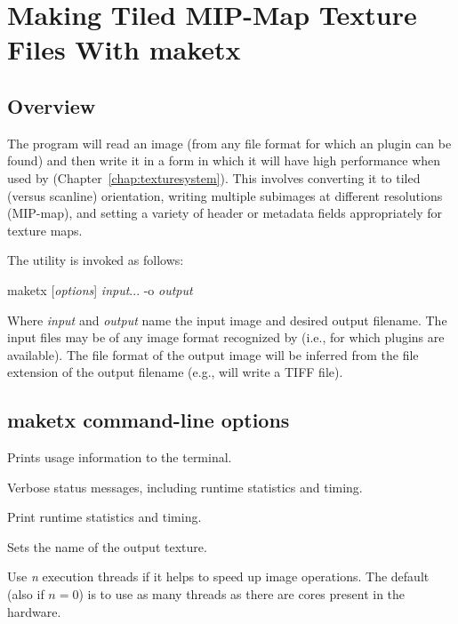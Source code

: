 \chapter{Making Tiled MIP-Map Texture Files With {\cf maketx}}
\label{chap:maketx}

\section{Overview}

The \maketx program will read an image (from any file format for
which an \ImageInput plugin can be found) and then write it in a form
in which it will have high performance when used by \TextureSystem
(Chapter~\ref{chap:texturesystem}).  This involves converting it to
tiled (versus scanline) orientation, writing multiple subimages at
different resolutions (MIP-map), and setting a variety of header or
metadata fields appropriately for texture maps.

The \maketx utility is invoked as follows:

\medskip

\hspace{0.25in} {\cf maketx} [\emph{options}] \emph{input}... -o \emph{output}

\medskip

Where \emph{input} and \emph{output} name the input image and desired
output filename.  The input files may be of any image format recognized by
\product (i.e., for which \ImageInput plugins are available).  The file
format of the output image will be inferred from the file extension of
the output filename (e.g.,  will write a TIFF file).


\section{{\cf maketx} command-line options}

Prints usage information to the terminal.
\apiend

Verbose status messages, including runtime statistics and timing.
\apiend

Print runtime statistics and timing.
\apiend

Sets the name of the output texture.
\apiend

Use \emph{n} execution threads if it helps to speed up image operations.
The default (also if $n=0$) is to use as many threads as there are cores
present in the hardware.
\apiend

